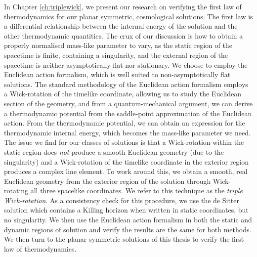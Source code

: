 In Chapter \ref{ch:triplewick}, we present our research on verifying the first law of thermodynamics for our planar symmetric, cosmological solutions. The first law is a differential relationship between the internal energy of the solution and the other thermodynamic quantities. The crux of our discussion is how to obtain a properly normalised mass-like parameter to vary, as the static region of the spacetime is finite, containing a singularity, and the external region of the spacetime is neither asymptotically flat nor stationary. We choose to employ the Euclidean action formalism, which is well suited to non-asymptotically flat solutions. The standard methodology of the Euclidean action formalism employs a Wick-rotation of the timelike coordinate, allowing us to study the Euclidean section of the geometry, and from a quantum-mechanical argument, we can derive a thermodynamic potential from the saddle-point approximation of the Euclidean action. From the thermodynamic potential, we can obtain an expression for the thermodynamic internal energy, which becomes the mass-like parameter we need. The issue we find for our classes of solutions is that a Wick-rotation within the static region does \emph{not} produce a smooth Euclidean geometry (due to the singularity) and a Wick-rotation of the timelike coordinate in the exterior region produces a complex line element. To work around this, we obtain a smooth, real Euclidean geometry from the exterior region of the solution through Wick-rotating all three spacelike coordinates. We refer to this technique as the \emph{triple Wick-rotation}. As a consistency check for this procedure, we use the de Sitter solution which contains a Killing horizon when written in static coordinates, but no singularity. We then use the Euclidean action formalism in both the static and dynamic regions of solution and verify the results are the same for both methods. We then turn to the planar symmetric solutions of this thesis to verify the first law of thermodynamics. 

